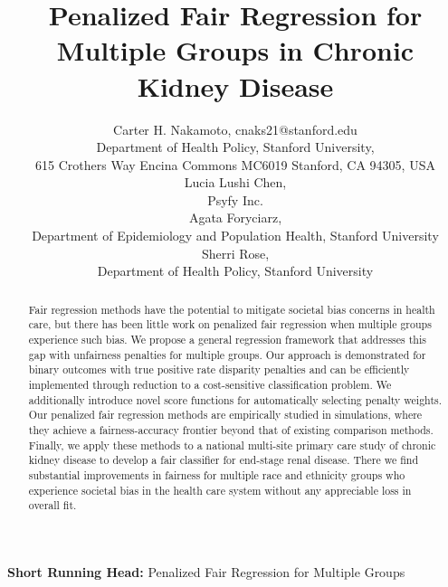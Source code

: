\documentclass[
  12pt]{article}
\begin{document}
\def\spacingset#1{\renewcommand{\baselinestretch}%
{#1}\small\normalsize} \spacingset{1}



\title{\bf Penalized Fair Regression for Multiple Groups in Chronic
Kidney Disease}
\author{
Carter H. Nakamoto, cnaks21@stanford.edu\\
Department of Health Policy, Stanford University,\\ 615 Crothers Way
Encina Commons MC6019 Stanford, CA 94305, USA\\
Lucia Lushi Chen, \\
Psyfy Inc.\\
Agata Foryciarz, \\
Department of Epidemiology and Population Health, Stanford University\\
Sherri Rose, \\
Department of Health Policy, Stanford University\\
}
\maketitle

\bigskip
\begin{center}
\textbf{Short Running Head:} Penalized Fair Regression for Multiple Groups
\end{center}

\bigskip
\begin{abstract}
Fair regression methods have the potential to mitigate societal bias
concerns in health care, but there has been little work on penalized
fair regression when multiple groups experience such bias. We propose a
general regression framework that addresses this gap with unfairness
penalties for multiple groups. Our approach is demonstrated for binary
outcomes with true positive rate disparity penalties and can be
efficiently implemented through reduction to a cost-sensitive
classification problem. We additionally introduce novel score functions
for automatically selecting penalty weights. Our penalized fair
regression methods are empirically studied in simulations, where they
achieve a fairness-accuracy frontier beyond that of existing comparison
methods. Finally, we apply these methods to a national multi-site
primary care study of chronic kidney disease to develop a fair
classifier for end-stage renal disease. There we find substantial
improvements in fairness for multiple race and ethnicity groups who
experience societal bias in the health care system without any
appreciable loss in overall fit.
\end{abstract}
\end{document}
